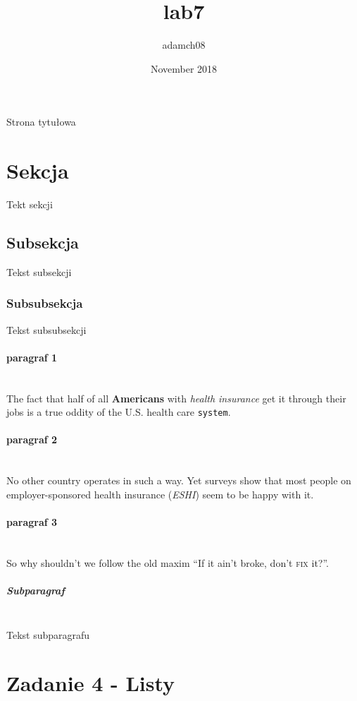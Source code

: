 \documentclass{article}
\title{lab7}
\author{adamch08 }
\date{November 2018}
\begin{document}
\titlepage
Strona tytułowa
\tableofcontents

\maketitle
\section{Sekcja}
Tekt sekcji
\subsection{Subsekcja}
Tekst subsekcji
\subsubsection{Subsubsekcja}
Tekst subsubsekcji
\paragraph{paragraf 1} ~\\
The fact that half of all \textbf{Americans} with \textit{health insurance} get it through their jobs is a true oddity of the U.S. health care \texttt{system}.
\paragraph{paragraf 2} ~\\
No other country operates in such a way. Yet surveys show that most people on employer-sponsored health insurance (\emph{ESHI}) seem to be \textnormal{happy} with it.
\paragraph{paragraf 3} ~\\
So why shouldn’t we follow the old maxim “If it ain’t broke, don’t \textsc{fix} it?”.

\subparagraph{Subparagraf} ~\\
Tekst subparagrafu
\appendix

\section{Zadanie 4 - Listy}
\end{document}
